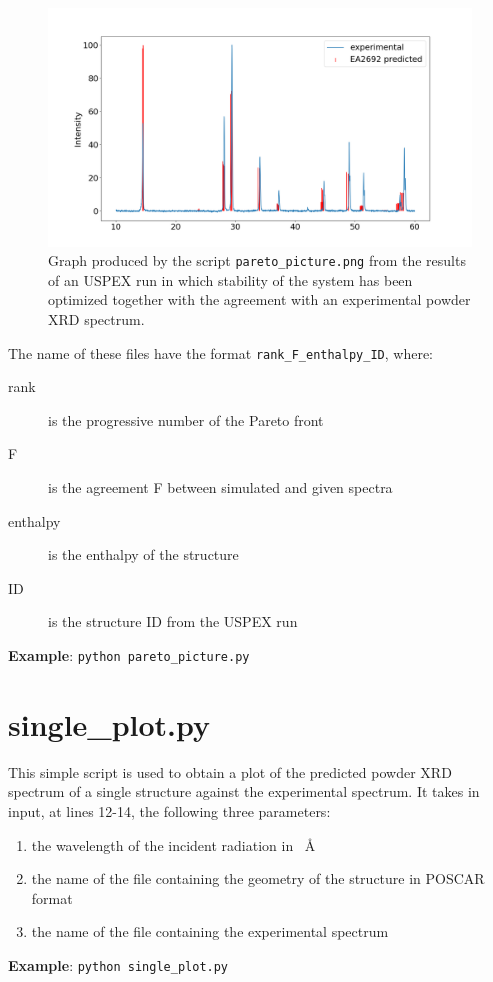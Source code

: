 \documentclass{article}
\begin{document}
\begin{figure}
	\centering
	\includegraphics[width=\textwidth]{1_0.210_0.000_EA2692.png}
	\caption{Graph produced by the script \texttt{pareto\_picture.png} from the results of an USPEX run in which stability of the system  has been optimized together with the agreement with an experimental powder XRD spectrum.}
	\label{fig:comparison}
\end{figure}
The name of these files have the format \texttt{rank\_F\_enthalpy\_ID}, where:
\begin{description}
	\item[rank] is the progressive number of the Pareto front
	\item[F] is the agreement F between simulated and given spectra
	\item[enthalpy] is the enthalpy of the structure
	\item[ID] is the structure ID from the USPEX run
\end{description}
\textbf{Example}: \texttt{python pareto\_picture.py}

\section{single\_plot.py}

This simple script is used to obtain a plot of the predicted powder XRD spectrum of a single structure against the experimental spectrum. It takes in input, at lines 12-14, the following three parameters:
\begin{enumerate}
	\item the wavelength of the incident radiation in \SI{}{\angstrom}
	\item the name of the file containing the geometry of the structure in POSCAR format
	\item the name of the file containing the experimental spectrum
\end{enumerate}
\textbf{Example}: \texttt{python single\_plot.py}
\end{document}
